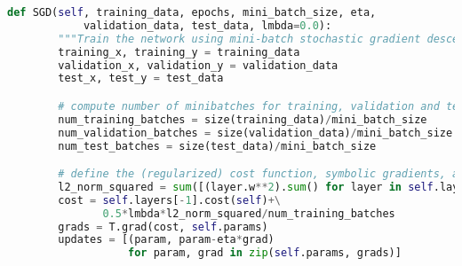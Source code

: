 \begin{lstlisting}[language=Python]
    def SGD(self, training_data, epochs, mini_batch_size, eta, 
            validation_data, test_data, lmbda=0.0):
        """Train the network using mini-batch stochastic gradient descent."""
        training_x, training_y = training_data
        validation_x, validation_y = validation_data
        test_x, test_y = test_data

        # compute number of minibatches for training, validation and testing
        num_training_batches = size(training_data)/mini_batch_size
        num_validation_batches = size(validation_data)/mini_batch_size
        num_test_batches = size(test_data)/mini_batch_size

        # define the (regularized) cost function, symbolic gradients, and updates
        l2_norm_squared = sum([(layer.w**2).sum() for layer in self.layers])
        cost = self.layers[-1].cost(self)+\
               0.5*lmbda*l2_norm_squared/num_training_batches
        grads = T.grad(cost, self.params)
        updates = [(param, param-eta*grad) 
                   for param, grad in zip(self.params, grads)]


\end{lstlisting}
